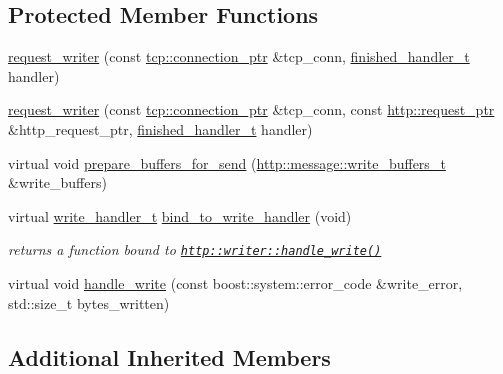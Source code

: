 \subsection*{Protected Member Functions}
\begin{DoxyCompactItemize}
\item 
\hyperlink{classpion_1_1http_1_1request__writer_ab4486ed8abf634f5e4d52f2052e1b126}{request\-\_\-writer} (const \hyperlink{namespacepion_1_1tcp_a6c9b7497068009f6d81d95ec0b0627d6}{tcp\-::connection\-\_\-ptr} \&tcp\-\_\-conn, \hyperlink{classpion_1_1http_1_1writer_a7e3ce4b88e0427adf673a99fca3af982}{finished\-\_\-handler\-\_\-t} handler)
\item 
\hyperlink{classpion_1_1http_1_1request__writer_ae0d35cd3af7f08e71cf47c90ca8e7a32}{request\-\_\-writer} (const \hyperlink{namespacepion_1_1tcp_a6c9b7497068009f6d81d95ec0b0627d6}{tcp\-::connection\-\_\-ptr} \&tcp\-\_\-conn, const \hyperlink{namespacepion_1_1http_ace432b70a9459d50ff4969a7a47f0ccb}{http\-::request\-\_\-ptr} \&http\-\_\-request\-\_\-ptr, \hyperlink{classpion_1_1http_1_1writer_a7e3ce4b88e0427adf673a99fca3af982}{finished\-\_\-handler\-\_\-t} handler)
\item 
virtual void \hyperlink{classpion_1_1http_1_1request__writer_aeef6096bf4fa008248be93a3c3158c2d}{prepare\-\_\-buffers\-\_\-for\-\_\-send} (\hyperlink{classpion_1_1http_1_1message_aacf9a6a7677c32e4ab764ac97d0b5e7b}{http\-::message\-::write\-\_\-buffers\-\_\-t} \&write\-\_\-buffers)
\item 
virtual \hyperlink{classpion_1_1http_1_1writer_a36fa31c850362d907559a0c1157a1bf3}{write\-\_\-handler\-\_\-t} \hyperlink{classpion_1_1http_1_1request__writer_a1ac6c4591f4a936391e78f394e18c9ed}{bind\-\_\-to\-\_\-write\-\_\-handler} (void)
\begin{DoxyCompactList}\small\item\em returns a function bound to \href{http::writer::handle_write()}{\tt http\-::writer\-::handle\-\_\-write()} \end{DoxyCompactList}\item 
virtual void \hyperlink{classpion_1_1http_1_1request__writer_a8cb6beccbb5f89356be78935f2ca59d4}{handle\-\_\-write} (const boost\-::system\-::error\-\_\-code \&write\-\_\-error, std\-::size\-\_\-t bytes\-\_\-written)
\end{DoxyCompactItemize}
\subsection*{Additional Inherited Members}


